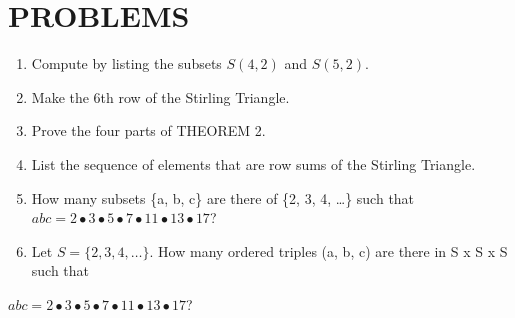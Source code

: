 \documentclass{article}
\begin{document}
\section{}
\section{}
\section[]{}
\section{}
\section{}
\section{}
\section{}
\section{}
\section{}
\section{}
\section[PROBLEMS]{PROBLEMS}
\begin{enumerate}
\item Compute by listing the subsets  $S(4,2)$ and  $S(5,2)$.
\item Make the 6th row of the Stirling Triangle. 
\item Prove the four parts of THEOREM 2. 
\item List the sequence of elements that are row sums of the Stirling Triangle. 
\item How many subsets \{a, b, c\} are there of \{2, 3, 4, …\} such that 
$\mathit{abc}=2{\bullet}3{\bullet}5{\bullet}7{\bullet}11{\bullet}13{\bullet}17$?
\item Let  $S=\{2,3,4,{\dots}\}$. How many ordered triples (a, b, c) are there in S x S x S such that
\end{enumerate}
  $\mathit{abc}=2{\bullet}3{\bullet}5{\bullet}7{\bullet}11{\bullet}13{\bullet}17$?
\end{document}
